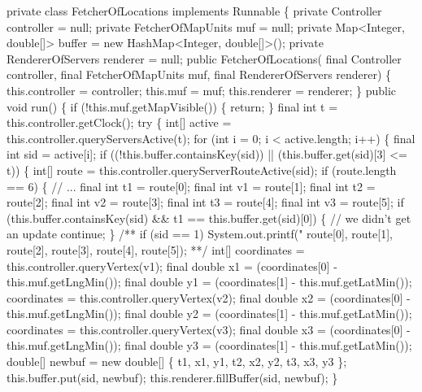 \nwenddocs{}\plusendmoddef
private class FetcherOfLocations implements Runnable \{
  private Controller controller = null;
  private FetcherOfMapUnits muf = null;
  private Map<Integer, double[]> buffer = new HashMap<Integer, double[]>();
  private RendererOfServers renderer = null;
  public FetcherOfLocations(
      final Controller controller,
      final FetcherOfMapUnits muf,
      final RendererOfServers renderer) \{
    this.controller = controller;
    this.muf = muf;
    this.renderer = renderer;
  \}
  public void run() \{
    if (!this.muf.getMapVisible()) \{
      return;
    \}
    final int t = this.controller.getClock();
    try \{
      int[] active = this.controller.queryServersActive(t);
      for (int i = 0; i < active.length; i++) \{
        final int sid = active[i];
        if ((!this.buffer.containsKey(sid)) || (this.buffer.get(sid)[3] <= t)) \{
          int[] route = this.controller.queryServerRouteActive(sid);
          if (route.length == 6) \{  // ...
            final int t1 = route[0];
            final int v1 = route[1];
            final int t2 = route[2];
            final int v2 = route[3];
            final int t3 = route[4];
            final int v3 = route[5];
if (this.buffer.containsKey(sid) && t1 == this.buffer.get(sid)[0]) \{
  // we didn't get an update
  continue;
\}
/**
if (sid == 1) System.out.printf("%
    route[0],
    route[1],
    route[2],
    route[3],
    route[4],
    route[5]);
**/
            int[] coordinates = this.controller.queryVertex(v1);
            final double x1 = (coordinates[0] - this.muf.getLngMin());
            final double y1 = (coordinates[1] - this.muf.getLatMin());
            coordinates = this.controller.queryVertex(v2);
            final double x2 = (coordinates[0] - this.muf.getLngMin());
            final double y2 = (coordinates[1] - this.muf.getLatMin());
            coordinates = this.controller.queryVertex(v3);
            final double x3 = (coordinates[0] - this.muf.getLngMin());
            final double y3 = (coordinates[1] - this.muf.getLatMin());
            double[] newbuf = new double[] \{ t1, x1, y1, t2, x2, y2, t3, x3, y3 \};
            this.buffer.put(sid, newbuf);
            this.renderer.fillBuffer(sid, newbuf);
          \}
